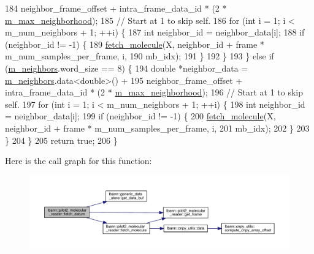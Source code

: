 \begin{DoxyCode}
184       neighbor\_frame\_offset + intra\_frame\_data\_id * (2 * \hyperlink{classlbann_1_1pilot2__molecular__reader_a0c9e71035cf47191002d1b164d056f50}{m\_max\_neighborhood});
185     \textcolor{comment}{// Start at 1 to skip self.}
186     \textcolor{keywordflow}{for} (\textcolor{keywordtype}{int} i = 1; i < m\_num\_neighbors + 1; ++i) \{
187       \textcolor{keywordtype}{int} neighbor\_id = neighbor\_data[i];
188       \textcolor{keywordflow}{if} (neighbor\_id != -1) \{
189         \hyperlink{classlbann_1_1pilot2__molecular__reader_ae45c583f72e11aeb5d955e2657a9a3e8}{fetch\_molecule}(X, neighbor\_id + frame * m\_num\_samples\_per\_frame, i,
190                        mb\_idx);
191       \}
192     \}
193   \} \textcolor{keywordflow}{else} \textcolor{keywordflow}{if} (\hyperlink{classlbann_1_1pilot2__molecular__reader_a0d8dc24b8ea66352a4d45a157b3a3c04}{m\_neighbors}.word\_size == 8) \{
194     \textcolor{keywordtype}{double} *neighbor\_data = \hyperlink{classlbann_1_1pilot2__molecular__reader_a0d8dc24b8ea66352a4d45a157b3a3c04}{m\_neighbors}.data<\textcolor{keywordtype}{double}>() +
195       neighbor\_frame\_offset + intra\_frame\_data\_id * (2 * \hyperlink{classlbann_1_1pilot2__molecular__reader_a0c9e71035cf47191002d1b164d056f50}{m\_max\_neighborhood});
196     \textcolor{comment}{// Start at 1 to skip self.}
197     \textcolor{keywordflow}{for} (\textcolor{keywordtype}{int} i = 1; i < m\_num\_neighbors + 1; ++i) \{
198       \textcolor{keywordtype}{int} neighbor\_id = neighbor\_data[i];
199       \textcolor{keywordflow}{if} (neighbor\_id != -1) \{
200         \hyperlink{classlbann_1_1pilot2__molecular__reader_ae45c583f72e11aeb5d955e2657a9a3e8}{fetch\_molecule}(X, neighbor\_id + frame * m\_num\_samples\_per\_frame, i,
201                        mb\_idx);
202       \}
203     \}
204   \}
205   \textcolor{keywordflow}{return} \textcolor{keyword}{true};
206 \}
\end{DoxyCode}
Here is the call graph for this function\+:\nopagebreak
\begin{figure}[H]
\begin{center}
\leavevmode
\includegraphics[width=350pt]{classlbann_1_1pilot2__molecular__reader_a9ad317abcd6f5de777d536f7796a3b12_cgraph}
\end{center}
\end{figure}
